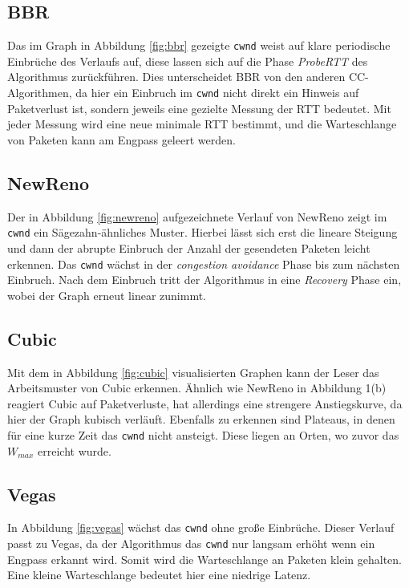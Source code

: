 \documentclass[paper=a4,fontsize=12pt,ngerman]{scrartcl}
\begin{document}
\subsection*{BBR}

Das im Graph in Abbildung \ref{fig:bbr} gezeigte \texttt{cwnd} weist auf klare periodische Einbrüche des Verlaufs auf, diese lassen
sich auf die Phase \textit{ProbeRTT} des Algorithmus zurückführen. Dies unterscheidet BBR von den anderen
CC-Algorithmen, da hier ein Einbruch im \texttt{cwnd} nicht direkt ein Hinweis auf Paketverlust ist, sondern jeweils eine 
gezielte Messung der RTT bedeutet. Mit jeder Messung wird eine neue minimale RTT bestimmt, und die Warteschlange von Paketen
kann am Engpass geleert werden.

\subsection*{NewReno}

Der in Abbildung \ref{fig:newreno} aufgezeichnete Verlauf von NewReno zeigt im \texttt{cwnd} ein Sägezahn-ähnliches Muster. Hierbei lässt sich erst
die lineare Steigung und dann der abrupte Einbruch der Anzahl der gesendeten Paketen leicht erkennen.
Das \texttt{cwnd} wächst in der \textit{congestion avoidance} Phase bis zum nächsten Einbruch.
Nach dem Einbruch tritt der Algorithmus in eine \textit{Recovery} Phase ein, wobei der Graph erneut linear zunimmt.

\subsection*{Cubic}

Mit dem in Abbildung \ref{fig:cubic} visualisierten Graphen kann der Leser das Arbeitsmuster von Cubic erkennen.
Ähnlich wie NewReno in Abbildung 1(b) reagiert Cubic auf Paketverluste, hat allerdings eine strengere Anstiegskurve,
da hier der Graph kubisch verläuft. Ebenfalls zu erkennen sind Plateaus, in denen für eine kurze Zeit das 
\texttt{cwnd} nicht ansteigt. Diese liegen an Orten, wo zuvor das $W_{max}$ erreicht wurde.

\subsection*{Vegas}

In Abbildung \ref{fig:vegas} wächst das \texttt{cwnd} ohne große Einbrüche. Dieser Verlauf passt zu Vegas, da der Algorithmus 
das \texttt{cwnd} nur langsam erhöht wenn ein Engpass erkannt wird. Somit wird die Warteschlange an Paketen klein gehalten.
Eine kleine Warteschlange bedeutet hier eine niedrige Latenz.
\end{document}
